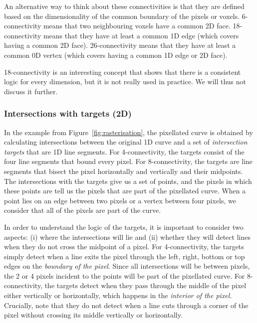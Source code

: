 An alternative way to think about these connectivities is that they are defined based on the dimensionality of the common boundary of the pixels or voxels.
6-connectivity means that two neighbouring voxels have a common 2D face.
18-connectivity means that they have at least a common 1D edge (which covers having a common 2D face).
26-connectivity means that they have at least a common 0D vertex (which covers having a common 1D edge or 2D face).

18-connectivity is an interesting concept that shows that there is a consistent logic for every dimension, but it is not really used in practice.
We will thus not discuss it further.

\subsubsection*{Intersections with targets (2D)}

In the example from Figure~\ref{fig:rasterisation}, the pixellated curve is obtained by calculating intersections between the original 1D curve and a set of \emph{intersection targets} that are 1D line segments.
For 4-connectivity, the targets consist of the four line segments that bound every pixel.
For 8-connectivity, the targets are line segments that bisect the pixel horizontally and vertically and their midpoints.
The intersections with the targets give us a set of points, and the pixels in which these points are tell us the pixels that are part of the pixellated curve.
When a point lies on an edge between two pixels or a vertex between four pixels, we consider that all of the pixels are part of the curve.

In order to understand the logic of the targets, it is important to consider two aspects: (i) where the intersections will lie and (ii) whether they will detect lines when they do not cross the midpoint of a pixel.
For 4-connectivity, the targets simply detect when a line exits the pixel through the left, right, bottom or top edges on the \emph{boundary of the pixel}.
Since all intersections will be between pixels, the 2 or 4 pixels incident to the points will be part of the pixellated curve.
For 8-connectivity, the targets detect when they pass through the middle of the pixel either vertically or horizontally, which happens in the \emph{interior of the pixel}.
Crucially, note that they do not detect when a line cuts through a corner of the pixel without crossing its middle vertically or horizontally.

